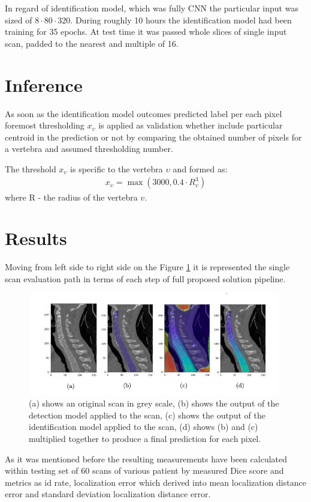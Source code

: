 In regard of identification model, which was fully CNN the particular input was sized of $8 \cdot 80 \cdot 320$. During roughly 10 hours the identification model had been training for 35 epochs. At test time it was passed whole slices of single input scan, padded to the nearest and multiple of 16.

\section{Inference}
As soon as the identification model outcomes predicted label per each pixel foremost thresholding $x_\upsilon$ is applied as validation whether include particular centroid in the prediction or not by comparing the obtained  number of pixels for a vertebra and assumed thresholding number.

The threshold $x_\upsilon$ is specific to the vertebra $\upsilon$ and formed as:
\begin{align*}
  x_\upsilon = \max(3000, 0.4 \cdot R_\upsilon^3) 
\end{align*}
where R - the radius of the vertebra $v$.

\section{Results}
Moving from left side to right side on the Figure \ref{fig:step_step_predictions} it is represented the single scan evaluation path in terms of each step of full proposed solution pipeline. 

\begin{figure}[h]
    \centering \includegraphics[width=11cm]{images/step_step_predictions.png}
    \caption {(a) shows an original scan in grey scale, (b) shows the output of the detection model applied to the scan, (c) shows the output of the identification model
    applied to the scan, (d) shows (b) and (c) multiplied together to produce a final prediction for each pixel.}
    \label{fig:step_step_predictions}
\end{figure}

As it was mentioned before the resulting measurements have been calculated within testing set of 60 scans of various patient by measured Dice score and metrics as id rate, localization error which derived into mean localization distance error and standard deviation localization distance error.

